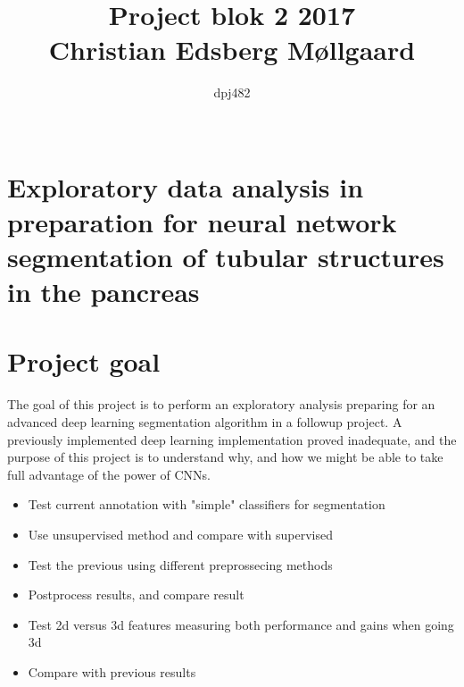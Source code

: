 \documentclass{article}
\author{
\Large{dpj482}\\
    \\ \texttt{}
}
\title{
  \vspace{3cm}
  \Huge{Project blok 2 2017} \\
  \Large{Christian Edsberg Møllgaard}
}
\begin{document}


\clearpage\maketitle
\thispagestyle{empty}

\newpage

\section{Exploratory data analysis in preparation for neural network 
segmentation of tubular structures in the pancreas} %
\label{sec:title}


\section{Project goal} %
\label{sec:project_goal}
The goal of this project is to perform an exploratory analysis preparing for an
advanced deep learning segmentation algorithm in a followup project.
A previously implemented deep learning implementation proved inadequate,
and the purpose of this project is to understand why,
and how we might be able to take full advantage of the power of CNNs.

\begin{itemize}
    \item Test current annotation with "simple" classifiers for segmentation
    \item Use unsupervised method and compare with supervised
    \item Test the previous using different preprossecing methods
    \item Postprocess results, and compare result
    \item Test 2d versus 3d features measuring both performance and gains when going 3d
    \item Compare with previous results
\end{itemize}
\end{document}
